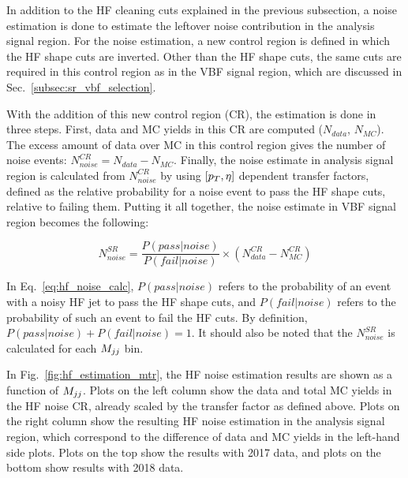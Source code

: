 In addition to the HF cleaning cuts explained in the previous subsection,
a noise estimation is done to estimate the leftover noise contribution in  
the analysis signal region. For the noise estimation, a new control region is defined
in which the HF shape cuts are inverted. Other than the HF shape cuts,
the same cuts are required in this control region as in the VBF signal region, which are
discussed in Sec.~\ref{subsec:sr_vbf_selection}.

With the addition of this new control region (CR), the estimation is done in three steps.
First, data and MC yields in this CR are computed ($N_{data}$, $N_{MC}$). The excess amount of data over MC 
in this control region gives the number of noise events: $N_{noise}^{CR} = N_{data} - N_{MC}$. 
Finally, the noise estimate in analysis signal region is calculated from $N_{noise}^{CR}$ by using $[p_T, \eta]$ dependent transfer factors,
defined as the relative probability for a noise event to pass the HF shape cuts, relative to failing them. 
Putting it all together, the noise estimate in VBF signal region becomes the following:

\begin{equation}
    N_{noise}^{SR} = \frac{P(pass | noise)}{P(fail | noise)} \times (N_{data}^{CR} - N_{MC}^{CR})
    \label{eq:hf_noise_calc}
\end{equation}

In Eq.~\ref{eq:hf_noise_calc}, $P(pass | noise)$ refers to the probability of an event with a noisy HF jet to pass the HF shape cuts, and $P(fail | noise)$ refers to the 
probability of such an event to fail the HF cuts. By definition, $P(pass | noise) + P(fail | noise) = 1$. It should also be noted that the $N_{noise}^{SR}$ 
is calculated for each $M_{jj}$ bin.

In Fig.~\ref{fig:hf_estimation_mtr}, the HF noise estimation results are shown as a function of $M_{jj}$. Plots on the left column show the data and total MC
yields in the HF noise CR, already scaled by the transfer factor as defined above. Plots on the right column show the resulting HF noise estimation in the analysis
signal region, which correspond to the difference of data and MC yields in the left-hand side plots.
Plots on the top show the results with 2017 data, and plots on the bottom show results with 2018 data.

